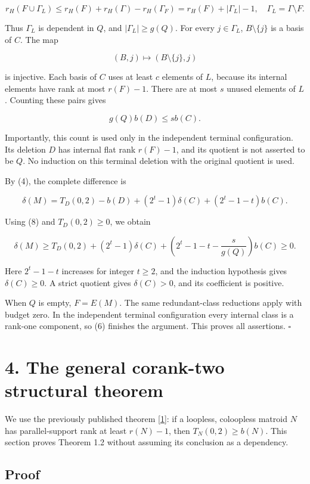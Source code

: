 \documentclass[11pt]{article}
\begin{document}
\[
r_H(F\cup\Gamma_L)\le r_H(F)+r_H(\Gamma)-r_H(\Gamma_F)
=r_H(F)+|\Gamma_L|-1,
\quad \Gamma_L=\Gamma\setminus F. \tag{7}
\]

Thus \(\Gamma_L\) is dependent in \(Q\), and \(|\Gamma_L|\ge g(Q)\). For every \(j\in\Gamma_L\), \(B\setminus\{j\}\) is a basis of \(C\). The map

\[
(B,j)\longmapsto(B\setminus\{j\},j)
\]

is injective. Each basis of \(C\) uses at least \(c\) elements of \(L\), because its internal elements have rank at most \(r(F)-1\). There are at most \(s\) unused elements of \(L\). Counting these pairs gives

\[
g(Q)b(D)\le s b(C). \tag{8}
\]

Importantly, this count is used only in the independent terminal configuration. Its deletion \(D\) has internal flat rank \(r(F)-1\), and its quotient is not asserted to be \(Q\). No induction on this terminal deletion with the original quotient is used.

By (4), the complete difference is

\[
\delta(M)=T_D(0,2)-b(D)+(2^t-1)\delta(C)
+(2^t-1-t)b(C).
\]

Using (8) and \(T_D(0,2)\ge0\), we obtain

\[
\delta(M)\ge T_D(0,2)+(2^t-1)\delta(C)
+\left(2^t-1-t-\frac{s}{g(Q)}\right)b(C)\ge0. \tag{9}
\]

Here \(2^t-1-t\) increases for integer \(t\ge2\), and the induction hypothesis gives \(\delta(C)\ge0\). A strict quotient gives \(\delta(C)>0\), and its coefficient is positive.

When \(Q\) is empty, \(F=E(M)\). The same redundant-class reductions apply with budget zero. In the independent terminal configuration every internal class is a rank-one component, so (6) finishes the argument. This proves all assertions. \hfill\(\square\)

\section*{4. The general corank-two structural theorem}

We use the previously published theorem \hyperlink{ref1}{[1]}: if a loopless, coloopless matroid \(N\) has parallel-support rank at least \(r(N)-1\), then \(T_N(0,2)\ge b(N)\). This section proves Theorem 1.2 without assuming its conclusion as a dependency.

\subsection*{Proof}
\end{document}
